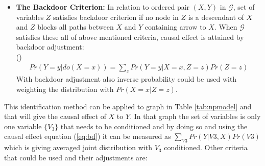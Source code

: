 \documentclass[main=english,12pt,a4paper,pdftex,econ,utf8]{aaltothesis}
\newcommand{\g}{\mathcal{G}}
\begin{document}
\begin{itemize}
    \item[] \textbf{The Backdoor Criterion:} In relation to ordered pair $(X,Y)$ in $\g$, set of variables $Z$ satisfies backdoor criterion if no node in $Z$ is a descendant of $X$ and $Z$ blocks all paths between $X$ and $Y$ containing arrow to $X$. When $\g$ satisfies these all of above mentioned criteria, causal effect is attained by backdoor adjustment: \\ 
    (\cite{Pearl2016})
    \begin{align}\label{eq:bd}
        Pr(Y=y|do(X=x))=\sum_{z}Pr(Y=y|X=x,Z=z)Pr(Z=z)
    \end{align}
    With backdoor adjustment also inverse probability could be used with weighting the distribution with $Pr(X=x|Z=z)$.
\end{itemize}

\noindent This identification method can be applied to graph in Table \ref{tab:npmodel} and that will give the causal effect of $X$ to $Y$. In that graph the set of variables is only one variable $\{V_{3}\}$ that needs to be conditioned and by doing so and using the causal effect equation (\ref{eq:bd}) it can be measured as $\sum_{V3}Pr(Y|V3,X)Pr(V3)$ which is giving averaged joint distribution with $V_{3}$ conditioned. Other criteria that could be used and their adjustments are:
\end{document}
